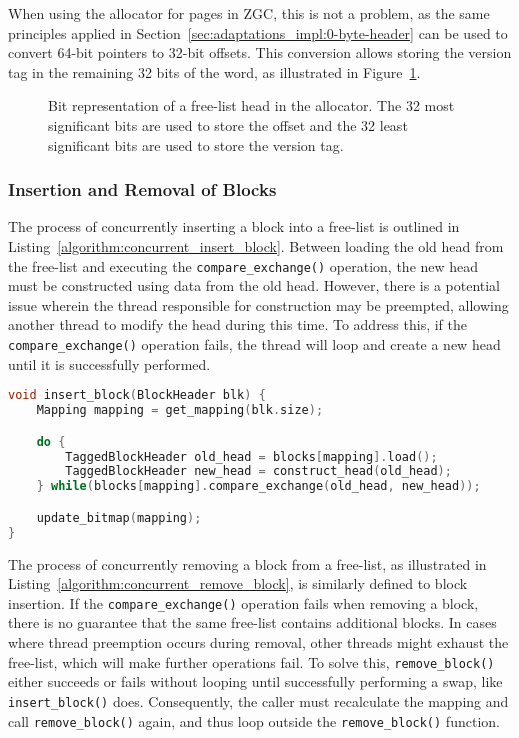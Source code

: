 When using the allocator for pages in ZGC, this is not a problem, as the same principles applied in Section~\ref{sec:adaptations_impl:0-byte-header} can be used to convert 64-bit pointers to 32-bit offsets. This conversion allows storing the version tag in the remaining 32 bits of the word, as illustrated in Figure~\ref{fig:concurrent_head_bits}.

\begin{figure}[h]
    \centering
    \vspace*{4mm}
    
    \caption{Bit representation of a free-list head in the allocator. The 32 most significant bits are used to store the offset and the 32 least significant bits are used to store the version tag.}
    \label{fig:concurrent_head_bits}
\end{figure}

\subsubsection{Insertion and Removal of Blocks}

The process of concurrently inserting a block into a free-list is outlined in Listing~\ref{algorithm:concurrent_insert_block}. Between loading the old head from the free-list and executing the \texttt{compare\_exchange()} operation, the new head must be constructed using data from the old head. However, there is a potential issue wherein the thread responsible for construction may be preempted, allowing another thread to modify the head during this time. To address this, if the \texttt{compare\_exchange()} operation fails, the thread will loop and create a new head until it is successfully performed.

\begin{lstlisting}[language=C++, caption={Concurrent insertion of a lock into the head of a free-list.}, label={algorithm:concurrent_insert_block}]
void insert_block(BlockHeader blk) {
    Mapping mapping = get_mapping(blk.size);

    do {
        TaggedBlockHeader old_head = blocks[mapping].load();
        TaggedBlockHeader new_head = construct_head(old_head);
    } while(blocks[mapping].compare_exchange(old_head, new_head));

    update_bitmap(mapping);
}
\end{lstlisting}

The process of concurrently removing a block from a free-list, as illustrated in Listing~\ref{algorithm:concurrent_remove_block}, is similarly defined to block insertion. If the \texttt{compare\_exchange()} operation fails when removing a block, there is no guarantee that the same free-list contains additional blocks. In cases where thread preemption occurs during removal, other threads might exhaust the free-list, which will make further operations fail. To solve this, \texttt{remove\_block()} either succeeds or fails without looping until successfully performing a swap, like \texttt{insert\_block()} does. Consequently, the caller must recalculate the mapping and call \texttt{remove\_block()} again, and thus loop outside the \texttt{remove\_block()} function.

